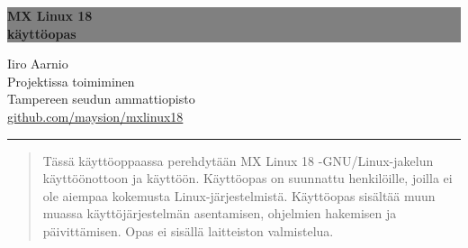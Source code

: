 \documentclass[a4paper, 12pt, finnish]{article}
\begin{document}
\begin{titlepage}
	\colorbox{grey}{
		\parbox[t]{0.93\textwidth}{
			\parbox[t]{0.91\textwidth}{ 
				\raggedleft 
				\fontsize{80pt}{80pt}\selectfont 
				\vspace{0.7cm} 
				\textbf{MX Linux 18\\
				käyttöopas\\}
				\vspace{0.7cm}  
			}
		}
	}
	\vfill
	\parbox[t]{0.93\textwidth}{ 
		\raggedleft 
		\large 
		{\Large Iiro Aarnio}\\[4pt] 
		Projektissa toimiminen\\
		Tampereen seudun ammattiopisto\\[4pt] 
		\url{github.com/maysion/mxlinux18}\\
		\hfill\rule{0.2\linewidth}{1pt}
	}
\end{titlepage}
\thispagestyle{empty}
\begin{abstract}
	Tässä käyttöoppaassa perehdytään MX Linux 18 -GNU/Linux-jakelun käyttöönottoon ja käyttöön. Käyttöopas on suunnattu henkilöille, joilla ei ole aiempaa kokemusta Linux-järjestelmistä. Käyttöopas sisältää muun muassa käyttöjärjestelmän asentamisen, ohjelmien hakemisen ja päivittämisen. Opas ei sisällä laitteiston valmistelua.
\end{abstract}

\newpage
\thispagestyle{empty} 
\tableofcontents
\newpage
{} 
\setcounter{page}{1} 
\newpage


\section{}
\end{document}
